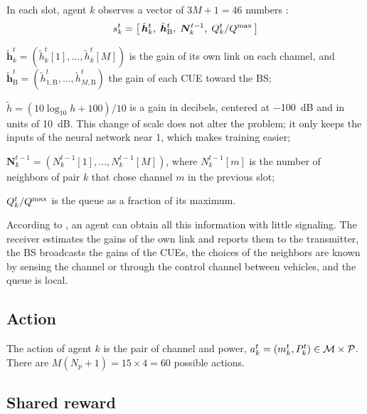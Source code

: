 In each slot, agent $k$ observes a vector of $3M + 1 = 46$ numbers \cite[Sec.~IV-A]{li+22fedmarl}:
\begin{equation}
  s_k^t = \bigl[\, \tilde{\bm{h}}_k^t,\; \tilde{\bm{h}}_{\mathrm{B}}^t,\; \bm{N}_k^{t-1},\;
    Q_k^t / Q^{\mathrm{max}} \,\bigr]
  \label{eq:sm-observation}
\end{equation}
\begin{wherelist}
  \item $\tilde{\bm{h}}_k^t = (\tilde h_k^t[1], \dots, \tilde h_k^t[M])$ is the gain of its own link on each
    channel, and $\tilde{\bm{h}}_{\mathrm{B}}^t = (\tilde h_{1,\mathrm{B}}^t, \dots,
    \tilde h_{M,\mathrm{B}}^t)$ the gain of each \ac{CUE} toward the \ac{BS};
  \item $\tilde h = (10 \log_{10} h + 100) / 10$ is a gain in decibels, centered at \SI{-100}{dB} and in
    units of \SI{10}{dB}. This change of scale does not alter the problem; it only keeps the inputs of the
    neural network near 1, which makes training easier;
  \item $\bm{N}_k^{t-1} = (N_k^{t-1}[1], \dots, N_k^{t-1}[M])$, where $N_k^{t-1}[m]$ is the number of
    neighbors of pair $k$ that chose channel $m$ in the previous slot;
  \item $Q_k^t / Q^{\mathrm{max}}$ is the queue as a fraction of its maximum.
\end{wherelist}
According to \citet{li+22fedmarl}, an agent can obtain all this information with little signaling. The
receiver estimates the gains of the own link and reports them to the transmitter, the \ac{BS} broadcasts
the gains of the \acp{CUE}, the choices of the neighbors are known by sensing the channel or through the
control channel between vehicles, and the queue is local.

\subsection{Action}
\label{sec:sm-action}

The action of agent $k$ is the pair of channel and power, $a_k^t = (m_k^t, P_k^t) \in \mathcal{M} \times
\mathcal{P}$. There are $M (N_p + 1) = 15 \times 4 = 60$ possible actions.

\subsection{Shared reward}
\label{sec:sm-shared-reward}

